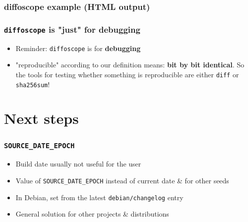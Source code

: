 \documentclass[14pt,aspectratio=169]{beamer}
\begin{document}
\begin{frame}
 \frametitle{diffoscope example (HTML output)}
\end{frame}

\begin{frame}
 \frametitle{\texttt{diffoscope} is "just" for debugging}

 \begin{itemize}
  \item Reminder: \texttt{diffoscope} is for \textbf{debugging}
  \item<2> "reproducible" according to our definition means: \textbf{bit by bit
  identical}. So the tools for testing whether something is reproducible are
  either \texttt{diff} or \texttt{sha256sum}!
 \end{itemize}
\end{frame}

\section{Next steps}

\begin{frame}
 \frametitle{\texttt{SOURCE\_DATE\_EPOCH}}

 \begin{itemize}
  \item Build date usually not useful for the user
  \item Value of \texttt{SOURCE\_DATE\_EPOCH} instead of current date \& for other seeds
  \item In Debian, set from the latest \texttt{debian/changelog} entry
  \item General solution for other projects \& distributions
 \end{itemize}
\end{frame}
\end{document}
